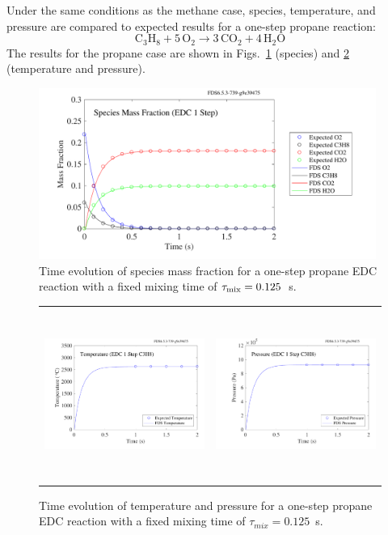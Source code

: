 \documentclass[11pt]{book}
\begin{document}
Under the same conditions as the methane case, species, temperature, and pressure are compared to expected results for a one-step propane reaction:
\begin{equation}\label{eq:1step_propane}
\mathrm{C_3H_8 + 5\, O_2 \rightarrow  3\, CO_2 + 4\, H_2O}
\end{equation}
The results for the propane case are shown in Figs.~\ref{fig:EDC_1Step_prop_spec} (species) and \ref{fig:EDC_1Step_prop_temppres} (temperature and pressure).

\begin{figure}[!ht]
\centering
\includegraphics[height=2.2in]{SCRIPT_FIGURES/reactionrate_EDC_flim_1step_C3H8_spec}
\caption[Species evolution in a 1-step propane EDC reaction]{Time evolution of species mass fraction for a one-step propane EDC reaction with a fixed mixing time of $\tau_{\rm mix}=0.125$~s.}
\label{fig:EDC_1Step_prop_spec}
\end{figure}

\begin{figure}[!ht]
\begin{tabular*}{\textwidth}{lr}
\includegraphics[height=2.2in]{SCRIPT_FIGURES/reactionrate_EDC_flim_1step_C3H8_temp} &
\includegraphics[height=2.2in]{SCRIPT_FIGURES/reactionrate_EDC_flim_1step_C3H8_pres}
\end{tabular*}
\caption[Temperature and pressure evolution in a 1-step propane EDC reaction]{Time evolution of temperature and pressure for a one-step propane EDC reaction with a fixed mixing time of $\tau_{mix}=0.125$~s.}
\label{fig:EDC_1Step_prop_temppres}
\end{figure}
\end{document}
